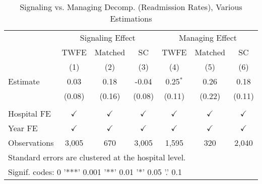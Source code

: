 \begin{table}[ht!]

\caption{\label{tab:signal_manage_read_estimators}Signaling vs. Managing Decomp. (Readmission Rates), Various Estimations}
\centering
\begin{tabular}[t]{lcccccc}
\toprule
\multicolumn{1}{c}{ } & \multicolumn{3}{c}{Signaling Effect} & \multicolumn{3}{c}{Managing Effect} \\
\cmidrule(l{3pt}r{3pt}){2-4} \cmidrule(l{3pt}r{3pt}){5-7}
\multicolumn{1}{c}{ } & \multicolumn{1}{c}{TWFE} & \multicolumn{1}{c}{Matched} & \multicolumn{1}{c}{SC} & \multicolumn{1}{c}{TWFE} & \multicolumn{1}{c}{Matched} & \multicolumn{1}{c}{SC} \\
\cmidrule(l{3pt}r{3pt}){2-2} \cmidrule(l{3pt}r{3pt}){3-3} \cmidrule(l{3pt}r{3pt}){4-4} \cmidrule(l{3pt}r{3pt}){5-5} \cmidrule(l{3pt}r{3pt}){6-6} \cmidrule(l{3pt}r{3pt}){7-7}
 & (1) & (2) & (3) & (4) & (5) & (6)\\
\midrule
Estimate & 0.03 & 0.18 & -0.04 & 0.25$^{*}$ & 0.26 & 0.18\\
 & (0.08) & (0.16) & (0.08) & (0.11) & (0.22) & (0.11)\\
 &  &  &  &  &  & \\
Hospital FE & $\checkmark$ & $\checkmark$ & $\checkmark$ & $\checkmark$ & $\checkmark$ & $\checkmark$\\
Year FE & $\checkmark$ & $\checkmark$ & $\checkmark$ & $\checkmark$ & $\checkmark$ & $\checkmark$\\
\addlinespace
Observations & 3,005 & 670 & 3,005 & 1,595 & 320 & 2,040\\
\bottomrule
\multicolumn{7}{l}{\textsuperscript{} Standard errors are clustered at the hospital level.}\\
\multicolumn{7}{l}{\textsuperscript{} Signif. codes: 0 '***' 0.001 '**' 0.01 '*' 0.05 '.' 0.1}\\
\end{tabular}
\end{table}
